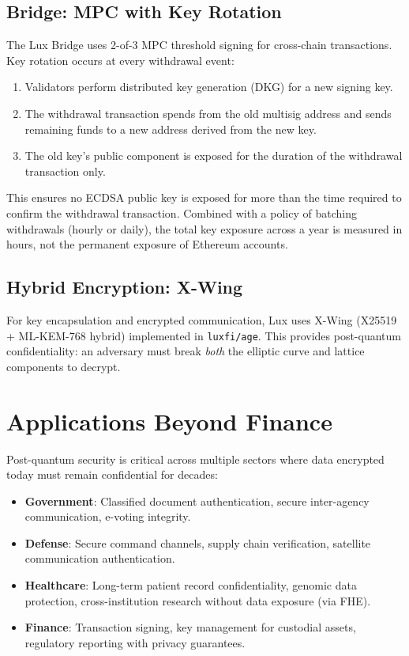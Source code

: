 \documentclass[11pt,a4paper]{article}
\begin{document}
\subsection{Bridge: MPC with Key Rotation}

The Lux Bridge uses 2-of-3 MPC threshold signing for cross-chain
transactions. Key rotation occurs at every withdrawal event:

\begin{enumerate}[nosep]
  \item Validators perform distributed key generation (DKG) for a new
        signing key.
  \item The withdrawal transaction spends from the old multisig address
        and sends remaining funds to a new address derived from the new
        key.
  \item The old key's public component is exposed for the duration of
        the withdrawal transaction only.
\end{enumerate}

This ensures no ECDSA public key is exposed for more than the time
required to confirm the withdrawal transaction. Combined with a
policy of batching withdrawals (hourly or daily), the total key
exposure across a year is measured in hours, not the permanent
exposure of Ethereum accounts.

\subsection{Hybrid Encryption: X-Wing}

For key encapsulation and encrypted communication, Lux uses X-Wing
(X25519 + ML-KEM-768 hybrid) implemented in \texttt{luxfi/age}. This
provides post-quantum confidentiality: an adversary must break
\emph{both} the elliptic curve and lattice components to decrypt.

\section{Applications Beyond Finance}

Post-quantum security is critical across multiple sectors where data
encrypted today must remain confidential for decades:

\begin{itemize}[nosep]
  \item \textbf{Government}: Classified document authentication,
        secure inter-agency communication, e-voting integrity.
  \item \textbf{Defense}: Secure command channels, supply chain
        verification, satellite communication authentication.
  \item \textbf{Healthcare}: Long-term patient record confidentiality,
        genomic data protection, cross-institution research without
        data exposure (via FHE).
  \item \textbf{Finance}: Transaction signing, key management for
        custodial assets, regulatory reporting with privacy guarantees.
\end{itemize}
\end{document}
